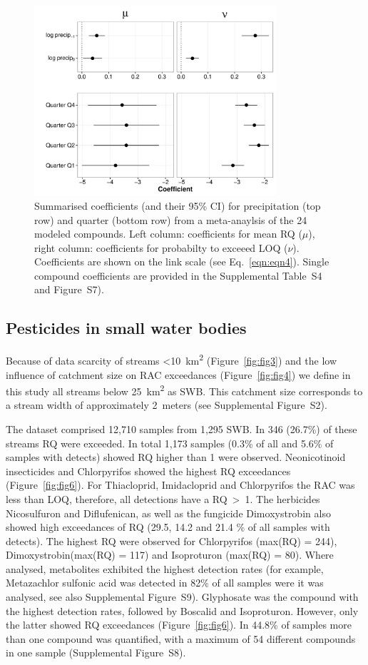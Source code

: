 \documentclass[journal=esthag,manuscript=article]{achemso}
\begin{document}
\begin{figure}[ht]
  \includegraphics[width=0.8\textwidth]{figure5.pdf}
  \caption{Summarised coefficients (and their 95\% CI) for precipitation (top row) and quarter (bottom row) from a meta-anaylsis of the 24 modeled compounds. Left column: coefficients for mean RQ ($\mu$), right column: coefficients for probabilty to exceeed LOQ ($\nu$). 
  Coefficients are shown on the link scale (see Eq.~\ref{eqn:eqn4}).
  Single compound coefficients are provided in the Supplemental Table~S4 and Figure~S7).
  }
  \label{fig:fig5}
\end{figure}



\subsection{Pesticides in small water bodies}
Because of data scarcity of streams \textless 10~km\textsuperscript{2} (Figure~\ref{fig:fig3}) and the low influence of catchment size on RAC exceedances (Figure~\ref{fig:fig4}) we define in this study all streams below 25~km\textsuperscript{2} as SWB. 
This catchment size corresponds to a stream width of approximately 2~meters (see Supplemental Figure~S2).

The dataset comprised 12,710 samples from 1,295 SWB.
In 346 (26.7\%) of these streams RQ were exceeded.
In total 1,173 samples (0.3\% of all and 5.6\% of samples with detects) showed RQ higher than 1 were observed.
Neonicotinoid insecticides and Chlorpyrifos showed the highest RQ exceedances (Figure~\ref{fig:fig6}).
For Thiacloprid, Imidacloprid and Chlorpyrifos the RAC was less than LOQ, therefore, all detections have a RQ~\textgreater~1. 
The herbicides Nicosulfuron and Diflufenican, as well as the fungicide Dimoxystrobin also showed high exceedances of RQ (29.5, 14.2 and 21.4 \% of all samples with detects).
The highest RQ were observed for Chlorpyrifos (max(RQ) = 244), Dimoxystrobin(max(RQ) = 117) and Isoproturon (max(RQ) = 80). 
Where analysed, metabolites exhibited the highest detection rates (for example, Metazachlor sulfonic acid was detected in 82\% of all samples were it was analysed, see also Supplemental Figure~S9).
Glyphosate was the compound with the highest detection rates, followed by Boscalid and Isoproturon. 
However, only the latter showed RQ exceedances (Figure~\ref{fig:fig6}).
In 44.8\% of samples more than one compound was quantified, with a maximum of 54 different compounds in one sample (Supplemental Figure~S8). 
\end{document}

